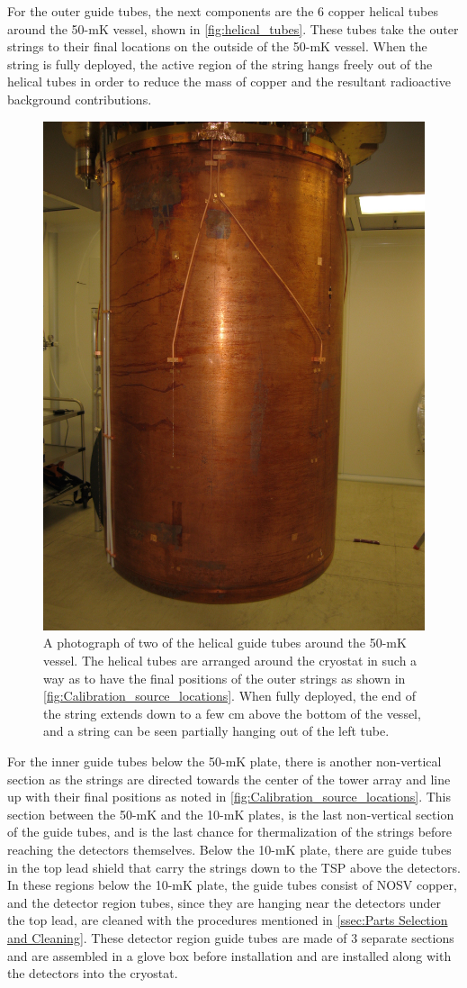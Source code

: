 For the outer guide tubes, the next components are the 6 copper helical tubes around the 50-mK vessel, shown in \autoref{fig:helical_tubes}.
These tubes take the outer strings to their final locations on the outside of the 50-mK vessel.
When the string is fully deployed, the active region of the string hangs freely out of the helical tubes in order to reduce the mass of copper and the resultant radioactive background contributions.
\begin{figure}[htbp]
    \centering
    \includegraphics[height = 3.5 in]{Figures/HelicalTubes.jpg}
    \caption[A photograph of two of the helical guide tubes around the 50-mK vessel.]
    {A photograph of two of the helical guide tubes around the 50-mK vessel.
    The helical tubes are arranged around the cryostat in such a way as to have the final positions of the outer strings as shown in \autoref{fig:Calibration_source_locations}.
    When fully deployed, the end of the string extends down to a few cm above the bottom of the vessel, and a string can be seen partially hanging out of the left tube.}
    \label{fig:helical_tubes}
\end{figure}

For the inner guide tubes below the 50-mK plate, there is another non-vertical section as the strings are directed towards the center of the tower array and line up with their final positions as noted in \autoref{fig:Calibration_source_locations}.
This section between the 50-mK and the 10-mK plates, is the last non-vertical section of the guide tubes, and is the last chance for thermalization of the strings before reaching the detectors themselves.
Below the 10-mK plate, there are guide tubes in the top lead shield that carry the strings down to the TSP above the detectors. 
In these regions below the 10-mK plate, the guide tubes consist of NOSV copper, and the detector region tubes, since they are hanging near the detectors under the top lead, are cleaned with the procedures mentioned in \autoref{ssec:Parts Selection and Cleaning}.
These detector region guide tubes are made of 3 separate sections and are assembled in a glove box before installation and are installed along with the detectors into the cryostat.

